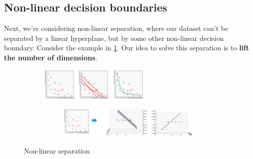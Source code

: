 \subsection{Non-linear decision boundaries}

Next, we're considering non-linear separation, where our dataset can't be separated by a linear hyperplane, but by some other non-linear decision boundary. Consider the example in \ref{fig:5_not_linear_separable}. Our idea to solve this separation is to \textbf{lift the number of dimensions}.

\begin{figure}[H]
  \centering
  \begin{subfigure}{\textwidth}
    \centering
    \includegraphics[width=0.58\textwidth]{assets/svm/nl__example.png}
  \end{subfigure}

  \vspace*{0.3cm}

  
  \begin{subfigure}{\textwidth}
    \centering
    \begin{subfigure}{0.9\textwidth}
      \includegraphics[width=0.64\textwidth]{assets/svm/nl__lift_1.png}\hspace*{0.3cm}
      \includegraphics[width=0.32\textwidth]{assets/svm/nl__lift_2.png}
    \end{subfigure}
  \end{subfigure}
  \caption{Non-linear separation}
  \label{fig:5_not_linear_separable}
\end{figure}

